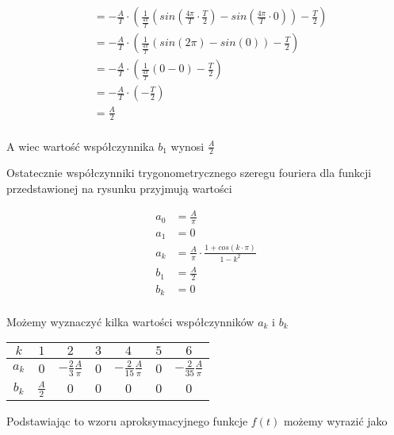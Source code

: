 \begin{task}
\begin{align*}
&=-\frac{A}{T} \cdot \left( \frac{1}{\frac{4\pi}{T}} \left( sin\left( \frac{4\pi}{T} \cdot \frac{T}{2} \right) - sin\left( \frac{4\pi}{T} \cdot 0 \right)\right) - \frac{T}{2} \right)\\
&=-\frac{A}{T} \cdot \left( \frac{1}{\frac{4\pi}{T}} \left( sin\left( 2\pi \right) - sin\left( 0 \right)\right) - \frac{T}{2} \right)\\
&=-\frac{A}{T} \cdot \left( \frac{1}{\frac{4\pi}{T}} \left( 0 - 0\right) - \frac{T}{2} \right)\\
&=-\frac{A}{T} \cdot \left(- \frac{T}{2} \right)\\
&=\frac{A}{2}\\
\end{align*}

A wiec wartość współczynnika $b_1$ wynosi $\frac{A}{2}$

Ostatecznie współczynniki trygonometrycznego szeregu fouriera dla funkcji przedstawionej na rysunku przyjmują wartości

\begin{equation}
\begin{aligned}
a_0&=\frac{A}{\pi}\\
a_1&=0\\
a_k&=\frac{A}{\pi} \cdot \frac{1 + cos\left(k\cdot\pi \right)}{1-k^2}\\
b_1&=\frac{A}{2}\\
b_k&=0\\
\end{aligned}
\end{equation}

Możemy wyznaczyć kilka wartości współczynników $a_k$ i $b_k$

\begin{table}[H]
  \centering  
  \begin{tabular}{|c|c|c|c|c|c|c|}
    \hline 
    $k$ & $1$ & $2$ & $3$ & $4$ & $5$ & $6$\\ 
    \hline 
    $a_k$ & $0$ & $-\frac{2}{3}\frac{A}{\pi}$ & $0$ & $-\frac{2}{15}\frac{A}{\pi}$ & $0$ & $-\frac{2}{35}\frac{A}{\pi}$\\ 
    \hline 
    $b_k$ & $\frac{A}{2}$ & $0$ & $0$ & $0$ & $0$ & $0$\\ 
    \hline 
  \end{tabular} 
\end{table}

Podstawiając to wzoru aproksymacyjnego funkcje $f(t)$ możemy wyrazić jako


\end{task}
